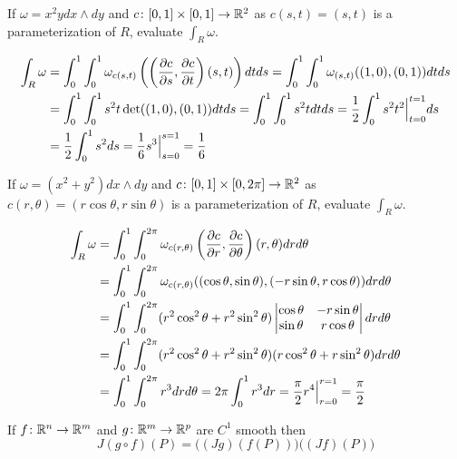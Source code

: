 \documentclass[notes.tex]{subfiles}
\begin{document}
\begin{exercise}
    If $\omega = x^2 y dx \wedge dy$ and $c\colon [0, 1] \times [0, 1] \to \mathbb{R}^2$ as $c(s, t) = (s, t)$ is a parameterization of $R$, evaluate $\int_R \omega$.
\end{exercise}
\begin{solution}
    \begin{align*}
        \int_R \omega
        &= \int_0^1 \int_0^1 \omega_{c(s, t)}\left( \left(\frac{\partial c}{\partial s}, \frac{\partial c}{\partial t}\right)(s, t) \right)dtds
        = \int_0^1 \int_0^1 \omega_{(s, t)}((1, 0), (0, 1))dtds \\
        &= \int_0^1 \int_0^1 s^2 t \operatorname{det}((1, 0), (0, 1)) dtds
        = \int_0^1 \int_0^1 s^2 t dtds
        = \frac{1}{2} \int_0^1 s^2 t^2\Big|_{t = 0}^{t = 1} ds \\
        &= \frac{1}{2} \int_0^1 s^2 ds
        = \frac{1}{6} s^3\Big|_{s = 0}^{s = 1}
        = \frac{1}{6}
    \end{align*}
\end{solution}

\begin{exercise}
    If $\omega = (x^2 + y^2)dx\wedge dy$ and $c\colon [0, 1] \times [0, 2\pi] \to \mathbb{R}^2$ as $c(r, \theta) = (r\cos \theta, r\sin \theta)$ is a parameterization of $R$, evaluate $\int_R \omega$.
\end{exercise}
\begin{solution}
    {\allowdisplaybreaks
    \begin{align*}
        \int_R \omega
        &= \int_0^1 \int_0^{2\pi} \omega_{c(r, \theta)}\left( \frac{\partial c}{\partial r}, \frac{\partial c}{\partial \theta} \right)(r, \theta) drd\theta \\
        &= \int_0^1 \int_0^{2\pi} \omega_{c(r, \theta)}( (\cos\theta, \sin\theta), (-r\sin\theta, r\cos\theta) )drd\theta \\
        &= \int_0^1 \int_0^{2\pi} (r^2\cos^2\theta + r^2\sin^2\theta)\begin{vmatrix}
            \cos \theta & -r\sin\theta \\
            \sin \theta & r\cos\theta
        \end{vmatrix}drd\theta \\
        &= \int_0^1 \int_0^{2\pi} (r^2\cos^2\theta + r^2\sin^2\theta)(r\cos^2\theta + r\sin^2\theta)drd\theta \\
        &= \int_0^1 \int_0^{2\pi} r^3 drd\theta
        = 2\pi\int_0^1 r^3 dr
        = \frac{\pi}{2} r^4\Big|_{r = 0}^{r = 1}
        = \frac{\pi}{2}
    \end{align*}
    }
\end{solution}

\begin{theorem}
    If $f\colon \mathbb{R}^n \to \mathbb{R}^m$ and $g\colon \mathbb{R}^m \to \mathbb{R}^p$ are $C^1$ smooth then
    \[
        J(g \circ f)(P) = \Big((Jg)(f(P)) \Big) \Big( (Jf) (P) \Big)
    \]
\end{theorem}

\end{document}
